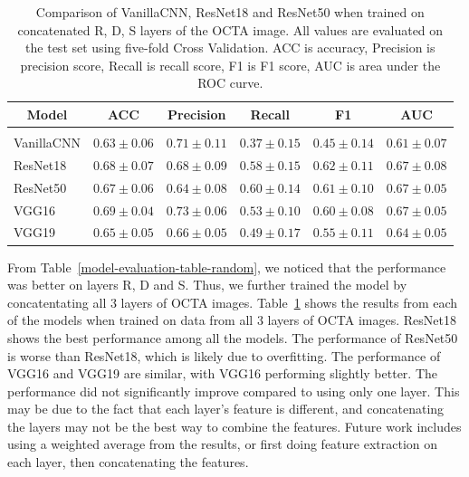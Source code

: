 \documentclass{article} %
\begin{document}
\begin{table}[h]
   \caption{Comparison of VanillaCNN, ResNet18 and ResNet50 when trained on concatenated R, D, S layers of the OCTA image. All values are evaluated on the test set using five-fold Cross Validation. ACC is accuracy, Precision is precision score, Recall is recall score, F1 is F1 score, AUC is area under the ROC curve.}
   \label{model-evaluation-table}
   \begin{center}
   \begin{tabular}{llllll}
   \multicolumn{1}{c}{\bf Model}  &\multicolumn{1}{c}{\bf ACC} &\multicolumn{1}{c}{\bf Precision} &\multicolumn{1}{c}{\bf Recall} &\multicolumn{1}{c}{\bf F1} &\multicolumn{1}{c}{\bf AUC}
   \\ \hline \\
   VanillaCNN       &$0.63\pm0.06$ &$0.71\pm0.11$ &$0.37\pm0.15$ &$0.45\pm0.14$ &$0.61\pm0.07$\\
   ResNet18         &$0.68\pm0.07$ &$0.68\pm0.09$ &$0.58\pm0.15$ &$0.62\pm0.11$ &$0.67\pm0.08$\\
   ResNet50         &$0.67\pm0.06$ &$0.64\pm0.08$ &$0.60\pm0.14$ &$0.61\pm0.10$ &$0.67\pm0.05$\\
   VGG16            &$0.69\pm0.04$ &$0.73\pm0.06$ &$0.53\pm0.10$ &$0.60\pm0.08$ &$0.67\pm0.05$\\
   VGG19            &$0.65\pm0.05$ &$0.66\pm0.05$ &$0.49\pm0.17$ &$0.55\pm0.11$ &$0.64\pm0.05$\\
   \end{tabular}
   \end{center}
   \end{table}

From Table~\ref{model-evaluation-table-random}, we noticed that the performance was better on layers R, D and S. Thus, we further trained the model by concatentating all 3 layers of OCTA images. Table~\ref{model-evaluation-table} shows the results from each of the models when trained on data from all 3 layers of OCTA images. ResNet18 shows the best performance among all the models. The performance of ResNet50 is worse than ResNet18, which is likely due to overfitting. The performance of VGG16 and VGG19 are similar, with VGG16 performing slightly better. The performance did not significantly improve compared to using only one layer. This may be due to the fact that each layer's feature is different, and concatenating the layers may not be the best way to combine the features. Future work includes using a weighted average from the results, or first doing feature extraction on each layer, then concatenating the features.
\end{document}
